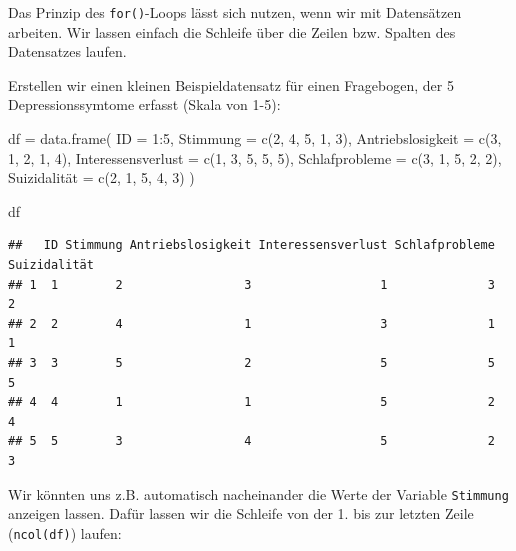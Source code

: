 \documentclass[
]{book}
\newenvironment{Shaded}{\begin{snugshade}}{\end{snugshade}}
\newcommand{\AttributeTok}[1]{\textcolor[rgb]{0.77,0.63,0.00}{#1}}
\newcommand{\DecValTok}[1]{\textcolor[rgb]{0.00,0.00,0.81}{#1}}
\newcommand{\FunctionTok}[1]{\textcolor[rgb]{0.00,0.00,0.00}{#1}}
\newcommand{\NormalTok}[1]{#1}
\newcommand{\OtherTok}[1]{\textcolor[rgb]{0.56,0.35,0.01}{#1}}
\newcommand{\SpecialCharTok}[1]{\textcolor[rgb]{0.00,0.00,0.00}{#1}}
\begin{document}
Das Prinzip des \texttt{for()}-Loops lässt sich nutzen, wenn wir mit Datensätzen arbeiten. Wir lassen einfach die Schleife über die Zeilen bzw. Spalten des Datensatzes laufen.

Erstellen wir einen kleinen Beispieldatensatz für einen Fragebogen, der 5 Depressionssymtome erfasst (Skala von 1-5):

\begin{Shaded}
\begin{Highlighting}[]
\NormalTok{df }\OtherTok{=} \FunctionTok{data.frame}\NormalTok{(}
  \AttributeTok{ID =} \DecValTok{1}\SpecialCharTok{:}\DecValTok{5}\NormalTok{,}
  \AttributeTok{Stimmung =} \FunctionTok{c}\NormalTok{(}\DecValTok{2}\NormalTok{, }\DecValTok{4}\NormalTok{, }\DecValTok{5}\NormalTok{, }\DecValTok{1}\NormalTok{, }\DecValTok{3}\NormalTok{),}
  \AttributeTok{Antriebslosigkeit =} \FunctionTok{c}\NormalTok{(}\DecValTok{3}\NormalTok{, }\DecValTok{1}\NormalTok{, }\DecValTok{2}\NormalTok{, }\DecValTok{1}\NormalTok{, }\DecValTok{4}\NormalTok{),}
  \AttributeTok{Interessensverlust =} \FunctionTok{c}\NormalTok{(}\DecValTok{1}\NormalTok{, }\DecValTok{3}\NormalTok{, }\DecValTok{5}\NormalTok{, }\DecValTok{5}\NormalTok{, }\DecValTok{5}\NormalTok{),}
  \AttributeTok{Schlafprobleme =} \FunctionTok{c}\NormalTok{(}\DecValTok{3}\NormalTok{, }\DecValTok{1}\NormalTok{, }\DecValTok{5}\NormalTok{, }\DecValTok{2}\NormalTok{, }\DecValTok{2}\NormalTok{),}
\NormalTok{  Suizidalität }\OtherTok{=} \FunctionTok{c}\NormalTok{(}\DecValTok{2}\NormalTok{, }\DecValTok{1}\NormalTok{, }\DecValTok{5}\NormalTok{, }\DecValTok{4}\NormalTok{, }\DecValTok{3}\NormalTok{)}
\NormalTok{)}

\NormalTok{df}
\end{Highlighting}
\end{Shaded}

\begin{verbatim}
##   ID Stimmung Antriebslosigkeit Interessensverlust Schlafprobleme Suizidalität
## 1  1        2                 3                  1              3            2
## 2  2        4                 1                  3              1            1
## 3  3        5                 2                  5              5            5
## 4  4        1                 1                  5              2            4
## 5  5        3                 4                  5              2            3
\end{verbatim}

Wir könnten uns z.B. automatisch nacheinander die Werte der Variable \texttt{Stimmung} anzeigen lassen. Dafür lassen wir die Schleife von der 1. bis zur letzten Zeile (\texttt{ncol(df)}) laufen:
\end{document}
